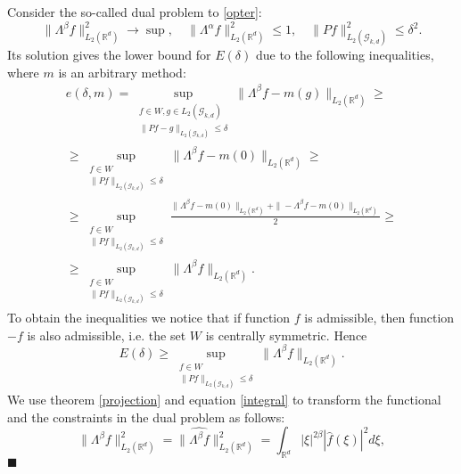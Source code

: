 \documentclass[12pt]{iopart}
\newenvironment{proof}
{\par\noindent{\bf Proof}}
{\hfill$\scriptstyle\blacksquare$}
\begin{document}
	\begin{proof}
		Consider the so-called dual problem to \eqref{opter}:
		\[
		\|\Lambda^\beta f\|^2_{L_2(\mathbb R^d)}\to\sup,\quad \|
		\Lambda^\alpha f\|^2_{L_2(\mathbb R^d)}\leqslant  1,\quad
		\|Pf\|^2_{L_2(\mathcal G_{k,d})}\leqslant  \delta^2.
		\]
		Its solution gives the lower bound for $E(\delta)$ due to the following inequalities, where $m$ is an arbitrary method:
		\begin{multline*}
		e(\delta,m)= \sup_{
			\begin{smallmatrix}
			f\in W, g\in L_2(\mathcal G_{k,d})\\ 
			\|Pf-g\|_{L_2(\mathcal G_{k,d})}\leqslant \delta
			\end{smallmatrix}}
		\|\Lambda^\beta f-m(g)\|_{L_2(\mathbb{R}^d)}\geqslant\\
		\geqslant\sup_{
			\begin{smallmatrix}
			f\in W\\ 
			\|Pf\|_{L_2(\mathcal G_{k,d})}\leqslant \delta
			\end{smallmatrix}}
		\|\Lambda^\beta f-m(0)\|_{L_2(\mathbb{R}^d)}\geqslant \\
		\geqslant \sup_{
			\begin{smallmatrix}
			f\in W\\ 
			\|Pf\|_{L_2(\mathcal G_{k,d})}\leqslant \delta
			\end{smallmatrix}}
		\frac{\|\Lambda^\beta f-m(0)\|_{L_2(\mathbb{R}^d)}+\|-\Lambda^\beta f-m(0)\|_{L_2(\mathbb{R}^d)}}{2}\geqslant \\
		\geqslant\sup_{
			\begin{smallmatrix}
			f\in W\\ 
			\|Pf\|_{L_2(\mathcal G_{k,d})}\leqslant \delta
			\end{smallmatrix}}
		\|\Lambda^\beta f\|_{L_2(\mathbb{R}^d)}.
		\end{multline*}
		To obtain the inequalities we notice that if function $f$ is admissible, then function $-f$ is also admissible, i.e. the set $W$ is centrally symmetric. Hence
		$$E(\delta)\geqslant\sup_{
			\begin{smallmatrix}
			f\in W\\ 
			\|Pf\|_{L_2(\mathcal G_{k,d})}\leqslant \delta
			\end{smallmatrix}}
		\|\Lambda^\beta f\|_{L_2(\mathbb{R}^d)}.$$
		We use theorem \ref{projection} and equation \eqref{integral} to transform the functional and the constraints in the dual problem as follows: 
		\[
		\|\Lambda^\beta f\|^2_{L_2(\mathbb R^d)}=\|\widehat{\Lambda^\beta f}\|^2_{L_2(\mathbb R^d)}=\int_{\mathbb R^d}|\xi|^{2\beta}|\widehat{f}(\xi )|^2d\xi,
\]
\end{proof}
\end{document}
